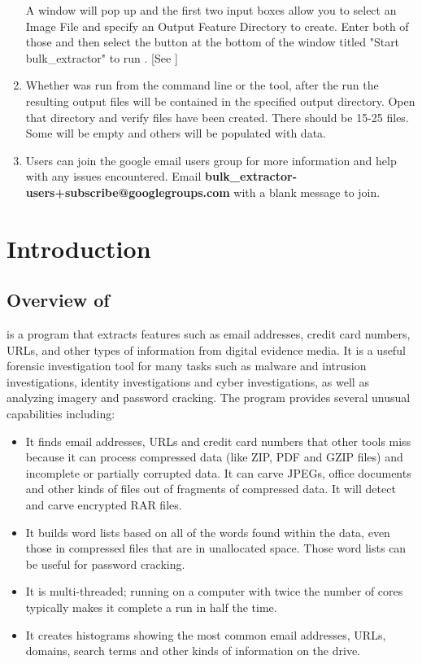 \documentclass[11pt]{article} %
\begin{document}
\begin{enumerate}
A window will pop up and the first two input boxes allow you to select an Image File and specify an Output Feature Directory to create. Enter both of those and then select the button at the bottom of the window titled "Start bulk\_extractor" to run \bulk.
[See \textbf{} \textbf{}]

\item Whether \bulk was run from the command line or the \viewer tool, after the run the resulting output files will be contained in the specified output directory. Open that directory and verify files have been created. There should be 15-25 files. Some will be empty and others will be populated with data.

\item Users can join the google email users group for more information and help with any issues encountered. Email \textbf{bulk\_extractor-users+subscribe@googlegroups.com} with a blank message to join.
\end{enumerate}
\newpage


\tableofcontents
\newpage
{}





\newpage

\section{Introduction}

\subsection{Overview of \bulk}
\bulk is a program that extracts features such as email addresses, credit card numbers, URLs, and other types of information from digital evidence media. It is a useful forensic investigation tool for many tasks such as malware and intrusion investigations, identity investigations and cyber investigations, as well as analyzing imagery and password cracking. The program provides several unusual capabilities including:
\begin{itemize}
\item It finds email addresses, URLs and credit card numbers that other tools miss because it can process compressed data (like ZIP, PDF and GZIP files) and incomplete or partially corrupted data. It can carve JPEGs, office documents and other kinds of files out of fragments of compressed data. It will detect and carve encrypted RAR files.
\item It builds word lists based on all of the words found within the data, even those in compressed files that are in unallocated space. Those word lists can be useful for password cracking.
\item It is multi-threaded; running \bulk on a computer with twice the number of cores typically makes it complete a run in half the time.
\item It creates histograms showing the most common email addresses, URLs, domains, search terms and other kinds of information on the drive.
\end{itemize}
\end{document}

